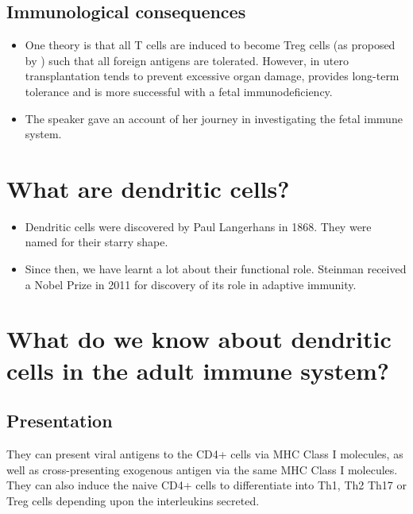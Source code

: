 \documentclass[a4paper]{article}
\begin{document}
\subsection{Immunological consequences}
\begin{itemize}
\item One theory is that all T cells are induced to become Treg cells (as proposed by \cite{pmid14996783}) such that all foreign antigens are tolerated. However, in utero transplantation tends to prevent excessive organ damage, provides long-term tolerance and is more successful with a fetal immunodeficiency.

\item The speaker gave an account of her journey in investigating the fetal immune system.
\end{itemize}

\section{What are dendritic cells?}
\begin{itemize}
\item Dendritic cells were discovered by Paul Langerhans in 1868. They were named for their starry shape.

\item Since then, we have learnt a lot about their functional role. Steinman received a Nobel Prize in 2011 for discovery of its role in adaptive immunity.

\end{itemize}

\section{What do we know about dendritic cells in the adult immune system?}

\subsection{Presentation}
They can present viral antigens to the CD4+ cells via MHC Class I molecules, as well as cross-presenting exogenous antigen via the same MHC Class I molecules. They can also induce the naive CD4+ cells to differentiate into Th1, Th2 Th17 or Treg cells depending upon the interleukins secreted.
\end{document}
